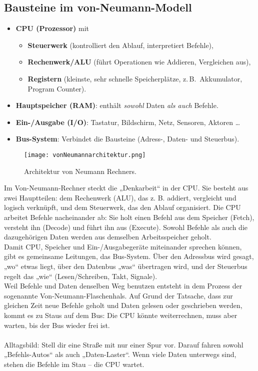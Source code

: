 \documentclass[../skript/main.tex]{subfiles}
\begin{document}
\subsection*{Bausteine im von-Neumann-Modell}
\begin{itemize}
	\item \textbf{CPU (Prozessor)} mit
	\begin{itemize}
		\item \textbf{Steuerwerk} (kontrolliert den Ablauf, interpretiert Befehle),
		\item \textbf{Rechenwerk/ALU} (führt Operationen wie Addieren, Vergleichen aus),
		\item \textbf{Registern} (kleinste, sehr schnelle Speicherplätze, z.\,B.\ Akkumulator, Program Counter).
	\end{itemize}
	\item \textbf{Hauptspeicher (RAM)}: enthält \emph{sowohl} Daten \emph{als auch} Befehle.
	\item \textbf{Ein-/Ausgabe (I/O)}: Tastatur, Bildschirm, Netz, Sensoren, Aktoren \dots
	\item \textbf{Bus-System}: Verbindet die Bausteine (Adress-, Daten- und Steuerbus).
\end{itemize}

\begin{figure}[H]
	\centering
	\texttt{[image: vonNeumannarchitektur.png]}
	\caption{Architektur von Neumann Rechners.}
	\label{fig:vonNeumannarchitektur}
\end{figure}

Im Von-Neumann-Rechner steckt die „Denkarbeit“ in der CPU. Sie besteht aus zwei Hauptteilen: dem Rechenwerk (ALU), das z. B. addiert, vergleicht und logisch verknüpft, und dem Steuerwerk, das den Ablauf organisiert. Die CPU arbeitet Befehle nacheinander ab: Sie holt einen Befehl aus dem Speicher (Fetch), versteht ihn (Decode) und führt ihn aus (Execute). Sowohl Befehle als auch die dazugehörigen Daten werden aus demselben Arbeitsspeicher geholt.\\
Damit CPU, Speicher und Ein-/Ausgabegeräte miteinander sprechen können, gibt es gemeinsame Leitungen, das Bus-System. Über den Adressbus wird gesagt, „wo“ etwas liegt, über den Datenbus „was“ übertragen wird, und der Steuerbus regelt das „wie“ (Lesen/Schreiben, Takt, Signale).\\
Weil Befehle und Daten denselben Weg benutzen entsteht in dem Prozess der sogenannte Von-Neumann-Flaschenhals. Auf Grund der Tatsache, dass zur gleichen Zeit neue Befehle geholt und Daten gelesen oder geschrieben werden, kommt es zu Staus auf dem Bus: Die CPU könnte weiterrechnen, muss aber warten, bis der Bus wieder frei ist.\\ \\
Alltagsbild: Stell dir eine Straße mit nur einer Spur vor. Darauf fahren sowohl „Befehls-Autos“ als auch „Daten-Laster“. Wenn viele Daten unterwegs sind, stehen die Befehle im Stau – die CPU wartet.
\end{document}
